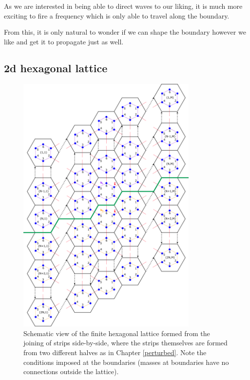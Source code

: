 
As we are interested in being able to direct waves to our liking, it is much
more exciting to fire a frequency which is only able to travel along the
boundary.


From this, it is only natural to wonder if we can shape the boundary however we
like and get it to propagate just as well.


\subsection{2d hexagonal lattice}
\begin{figure}[!h]
\centering
\includegraphics[width=0.8\textwidth]{imgs/hexfinitemodel.png}
\caption{\label{fig:kagomeM} Schematic view of the finite hexagonal lattice
  formed from the joining of strips side-by-side, where the strips themselves
  are formed from two different halves as in Chapter \ref{perturbed}. Note the
  conditions imposed at the boundaries (masses at boundaries have no
  connections outside the lattice).}
\end{figure}

